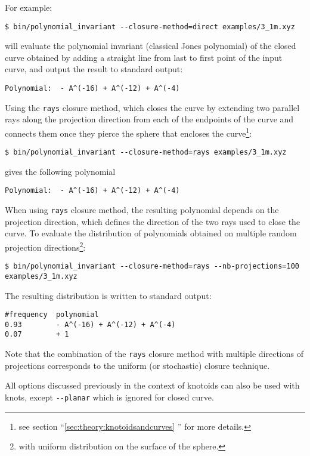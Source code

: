 For example:
\begin{lstlisting}
$ bin/polynomial_invariant --closure-method=direct examples/3_1m.xyz
\end{lstlisting}
will evaluate the polynomial invariant (classical Jones polynomial) of the closed curve obtained by adding a straight line from last to first point of the input curve, and output the result to standard output:
\begin{lstlisting}
Polynomial:  - A^(-16) + A^(-12) + A^(-4)
\end{lstlisting}
Using the \lstinline{rays} closure method, which closes the curve by extending two parallel rays along the projection direction from each of the endpoints of the curve and connects them once they pierce the sphere that encloses the curve\footnote{see section ``\ref{sec:theory:knotoidsandcurves} '' for more details.}:
\begin{lstlisting}
$ bin/polynomial_invariant --closure-method=rays examples/3_1m.xyz
\end{lstlisting}
gives the following polynomial
\begin{lstlisting}
Polynomial:  - A^(-16) + A^(-12) + A^(-4)
\end{lstlisting}
When using \lstinline{rays} closure method, the resulting polynomial depends on the projection direction, which defines the direction of the two rays used to close the curve. To evaluate the distribution of polynomials obtained on multiple random projection directions\footnote{with uniform distribution on the surface of the sphere.}:
\begin{lstlisting}
$ bin/polynomial_invariant --closure-method=rays --nb-projections=100 examples/3_1m.xyz
\end{lstlisting}
The resulting distribution is written to standard output:
\begin{lstlisting}
#frequency  polynomial
0.93        - A^(-16) + A^(-12) + A^(-4)
0.07        + 1
\end{lstlisting}
Note that the combination of the \lstinline{rays} closure method with multiple directions of projections corresponds to the uniform (or stochastic) closure technique.

All options discussed previously in the context of knotoids can also be used with knots, except \lstinline{--planar} which is ignored for closed curve.

